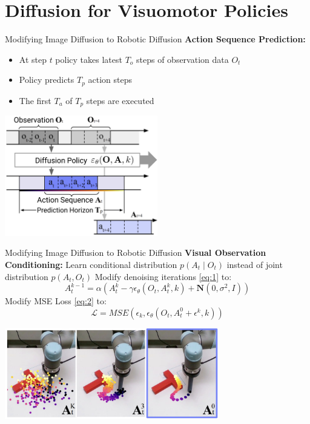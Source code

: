 \documentclass{beamer}
\begin{document}
\section{Diffusion for Visuomotor Policies}
\begin{frame}[t]{Modifying Image Diffusion to Robotic Diffusion}
    \textbf{Action Sequence Prediction:} 
    \begin{itemize}[label=-]
        \item At step $t$ policy takes latest $T_o$ steps of observation data $O_t$
        \item Policy predicts $T_p$ action steps
        \item The first $T_a$ of $T_p$ steps are executed
    \end{itemize}
    \begin{center}
    \includegraphics[width=0.5\textwidth]{./img/diffusion_overview.png}
    \end{center}

\end{frame}
\begin{frame}[t]{Modifying Image Diffusion to Robotic Diffusion}
    \textbf{Visual Observation Conditioning:} 
    Learn conditional distribution $p(A_t \mid O_t)$ instead of joint distribution $p(A_t, O_t)$
    \newline
    \newline
    Modify denoising iterations \eqref{eq:1} to:
    \[
    A_t^{k-1} = \alpha(A_t^k - \gamma \epsilon_\theta (O_t, A_t^k, k) + \textbf{N}(0, \sigma^2, I))
    \]
    Modify MSE Loss \eqref{eq:2} to:
    \[
        \mathcal{L} = MSE(\epsilon_k, \epsilon_\theta(O_t, A_t^0 + \epsilon^k, k))
    \]
    \begin{center}
        \includegraphics[width=0.7\textwidth]{./img/robotic_diffusion.png}
    \end{center}
\end{frame}
\end{document}
